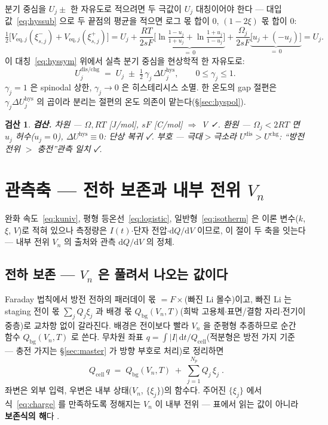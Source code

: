 \documentclass[11pt,a4paper]{article}
\newtheorem*{verifybox}{검산}
\newcommand{\dd}{\mathrm{d}}
\newcommand{\eq}{\mathrm{eq}}
\newcommand{\cell}{\mathrm{cell}}
\newcommand{\bg}{\mathrm{bg}}
\newcommand{\dis}{\mathrm{dis}}
\newcommand{\chg}{\mathrm{chg}}
\newcommand{\hys}{\mathrm{hys}}
\begin{document}
분기 중심을 $U_j\pm$ 한 자유도로 적으려면 두 극값이 $U_j$ 대칭이어야 한다 — 대입값~\eqref{eq:hyssub} 으로 두 끝점의 평균을 적으면 로그 몫 합이 $0$, $(1-2\xi)$ 몫 합이 $0$:
\begin{equation}
\tfrac12\big[V_{\eq,j}(\xi_{s,j}^-)+V_{\eq,j}(\xi_{s,j}^+)\big]
=U_j+\frac{RT}{2sF}
\underbrace{\Big[\ln\tfrac{1-u_j}{1+u_j}+\ln\tfrac{1+u_j}{1-u_j}\Big]}_{=\,0}
+\frac{\Omega_j}{2sF}\underbrace{\big[u_j+(-u_j)\big]}_{=\,0}
=U_j.
\label{eq:hyssym}
\end{equation}
이 대칭~\eqref{eq:hyssym} 위에서 실측 분기 중심을 현상학적 한 자유도로:
\begin{equation}
U_j^{\dis/\chg}\;=\;U_j\;\pm\;\tfrac12\,\gamma_j\,\Delta U_j^\hys,
\qquad 0\le\gamma_j\le1.
\label{eq:hyscenter}
\end{equation}
$\gamma_j=1$ 은 spinodal 상한, $\gamma_j\to0$ 은 히스테리시스 소멸. 한 온도의 gap 절편은 $\gamma_j\Delta U_j^\hys$ 의 곱이라 분리는 절편의 온도 의존이 맡는다(\S\ref{sec:hyspol}).

\begin{verifybox}
\textbf{검산.} 차원 — $\Omega,RT$ [J/mol], $sF$ [C/mol] $\Rightarrow$ V ✓. 환원 — $\Omega_j<2RT$ 면 $u_j$ 허수($u_j=0$), $\Delta U^\hys\equiv0$: 단상 복귀 ✓. 부호 — 극대$>$극소라 $U^{\dis}>U^{\chg}$: ``방전 전위 $>$ 충전''관측 일치 ✓.
\end{verifybox}

\section{관측축 — 전하 보존과 내부 전위 $V_n$}\label{sec:charge}
완화 속도~\eqref{eq:kuniv}, 평형 등온선~\eqref{eq:logistic}, 일반형~\eqref{eq:isotherm} 은 이론 변수($k$, $\xi$, $V$)로 적혀 있으나 측정량은 $I(t)$$\cdot$단자 전압$\cdot$$\dd Q/\dd V$ 이므로, 이 절이 두 축을 잇는다 — 내부 전위 $V_n$ 의 출처와 관측 $\dd Q/\dd V$ 의 정체.

\subsection{전하 보존 — $V_n$ 은 풀려서 나오는 값이다}
Faraday 법칙에서 방전 전하의 패러데이 몫 $=F\times$(빠진 Li 몰수)이고, 빠진 Li 는 staging 전이 몫 $\sum_jQ_j\xi_j$ 과 배경 몫 $Q_\bg(V_n,T)$(희박 고용체$\cdot$표면/결함 자리$\cdot$전기이중층)로 교차항 없이 갈라진다. 배경은 전이보다 빨라 $V_n$ 을 준평형 추종하므로 순간 함수 $Q_\bg(V_n,T)$ 로 쓴다. 무차원 좌표 $q=\int|I|\,\dd t/Q_\cell$(적분형은 방전 가지 기준 — 충전 가지는 \S\ref{sec:master} 가 방향 부호로 처리)로 정리하면
\begin{equation}
\boxed{\;Q_\cell\,q\;=\;Q_\bg(V_n,T)\;+\;\sum_{j=1}^{N_p}Q_j\,\xi_j\;.}
\label{eq:charge}
\end{equation}
좌변은 외부 입력, 우변은 내부 상태($V_n$, $\{\xi_j\}$)의 함수다. 주어진 $\{\xi_j\}$ 에서 식~\eqref{eq:charge} 를 만족하도록 정해지는 $V_n$ 이 내부 전위 — 표에서 읽는 값이 아니라 \textbf{보존식의 해}다 \cite{mckinnon1983,newman2004}.
\end{document}
